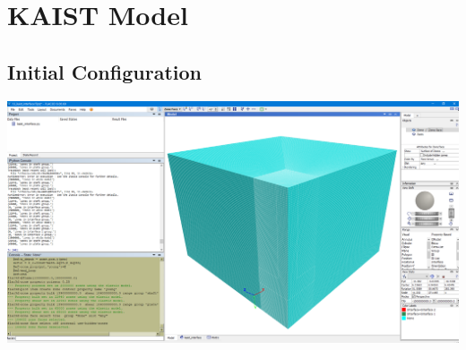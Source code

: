 \documentclass[a4paper, nobind]{templates/ociamthesis}
\begin{document}
\hypertarget{kaist-model}{%
\chapter{KAIST Model}\label{kaist-model}}

\hypertarget{initial-configuration}{%
\section{Initial Configuration}\label{initial-configuration}}

\includegraphics[width=1\linewidth]{myfigureeeeee/sofar}
\end{document}
